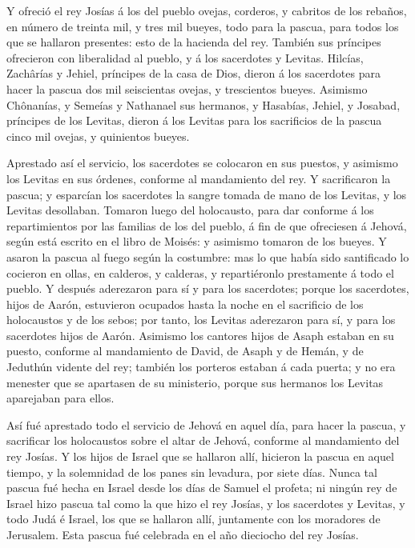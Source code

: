  Y ofreció el rey Josías á los del pueblo ovejas,
corderos, y cabritos de los rebaños, en número de treinta mil, y tres
mil bueyes, todo para la pascua, para todos los que se hallaron
presentes: esto de la hacienda del rey.  También sus
príncipes ofrecieron con liberalidad al pueblo, y á los sacerdotes y
Levitas. Hilcías, Zachârías y Jehiel, príncipes de la casa de Dios,
dieron á los sacerdotes para hacer la pascua dos mil seiscientas ovejas,
y trescientos bueyes.  Asimismo Chônanías, y Semeías y
Nathanael sus hermanos, y Hasabías, Jehiel, y Josabad, príncipes de los
Levitas, dieron á los Levitas para los sacrificios de la pascua cinco
mil ovejas, y quinientos bueyes.

 Aprestado así el servicio, los sacerdotes se colocaron
en sus puestos, y asimismo los Levitas en sus órdenes, conforme al
mandamiento del rey.  Y sacrificaron la pascua; y
esparcían los sacerdotes la sangre tomada de mano de los Levitas, y los
Levitas desollaban.  Tomaron luego del holocausto, para
dar conforme á los repartimientos por las familias de los del pueblo, á
fin de que ofreciesen á Jehová, según está escrito en el libro de
Moisés: y asimismo tomaron de los bueyes.  Y asaron la
pascua al fuego según la costumbre: mas lo que había sido santificado lo
cocieron en ollas, en calderos, y calderas, y repartiéronlo prestamente
á todo el pueblo.  Y después aderezaron para sí y para
los sacerdotes; porque los sacerdotes, hijos de Aarón, estuvieron
ocupados hasta la noche en el sacrificio de los holocaustos y de los
sebos; por tanto, los Levitas aderezaron para sí, y para los sacerdotes
hijos de Aarón.  Asimismo los cantores hijos de Asaph
estaban en su puesto, conforme al mandamiento de David, de Asaph y de
Hemán, y de Jeduthún vidente del rey; también los porteros estaban á
cada puerta; y no era menester que se apartasen de su ministerio, porque
sus hermanos los Levitas aparejaban para ellos.

 Así fué aprestado todo el servicio de Jehová en aquel
día, para hacer la pascua, y sacrificar los holocaustos sobre el altar
de Jehová, conforme al mandamiento del rey Josías.  Y los
hijos de Israel que se hallaron allí, hicieron la pascua en aquel
tiempo, y la solemnidad de los panes sin levadura, por siete días.
 Nunca tal pascua fué hecha en Israel desde los días de
Samuel el profeta; ni ningún rey de Israel hizo pascua tal como la que
hizo el rey Josías, y los sacerdotes y Levitas, y todo Judá é Israel,
los que se hallaron allí, juntamente con los moradores de Jerusalem.
 Esta pascua fué celebrada en el año dieciocho del rey
Josías.

